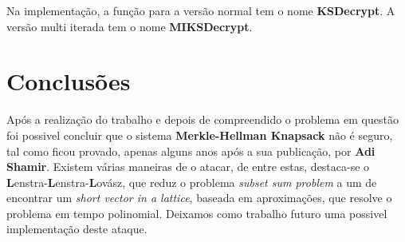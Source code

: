 \documentclass[11pt, language=portuguese]{report}
\begin{document}
Na implementação, a função para a versão normal tem o nome \textbf{KSDecrypt}. A versão multi iterada tem o nome \textbf{MIKSDecrypt}.

\chapter{Conclusões}

Após a realização do trabalho e depois de compreendido o problema em questão foi possivel concluir que o sistema \textbf{Merkle-Hellman Knapsack} não é seguro, tal como ficou provado, apenas alguns anos após a sua publicação, por \textbf{Adi Shamir}.
Existem várias maneiras de o atacar, de entre estas, destaca-se o \textbf{L}enstra-\textbf{L}enstra-\textbf{L}ovász\autocite{handbook}, que reduz o problema \textit{subset sum problem} a um de encontrar um \textit{short vector in a lattice}, baseada em aproximações, que resolve o problema em tempo polinomial. Deixamos como trabalho futuro uma possivel implementação deste ataque.

\printbibliography
\end{document}
